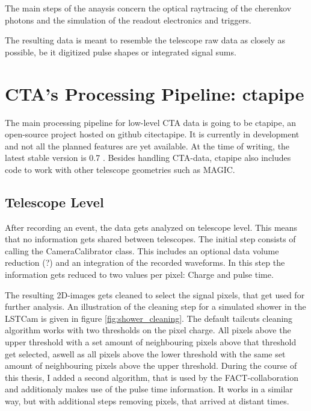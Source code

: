 The main steps of the anaysis concern the optical raytracing of the cherenkov photons
and the simulation of the readout electronics and triggers.

The resulting data is meant to resemble the telescope raw data as closely as possible,
be it digitized pulse shapes or integrated signal sums.

\section{CTA's Processing Pipeline: ctapipe}
The main processing pipeline for low-level  CTA data is going to be ctapipe,
an open-source project hosted on github cite{ctapipe}.
It is currently in development and not all the planned 
features are yet available.
At the time of writing, the latest stable version is 0.7
\cite{karl_kosack_2019_3372211}.
Besides handling CTA-data, ctapipe also includes code to work with
other telescope geometries such as MAGIC.

\subsection{Telescope Level}
After recording an event, the data gets analyzed on telescope level.
This means that no information gets shared between telescopes.
The initial step consists of calling the
CameraCalibrator class. This includes an optional
data volume reduction (?) and an integration of the recorded waveforms.
In this step the information gets reduced to two values per pixel:
Charge and pulse time.

The resulting 2D-images gets cleaned to select the signal pixels,
that get used for further analysis.
An illustration of the cleaning step 
for a simulated shower in the LSTCam is given in figure \ref{fig:shower_cleaning}.
The default tailcuts cleaning algorithm works with two thresholds on the 
pixel charge. All pixels above the upper threshold with a set amount of neighbouring 
pixels above that threshold get selected, aswell as 
all pixels above the lower threshold with the same set amount of neighbouring pixels
above the upper threshold.
During the course of this thesis, I added a second algorithm, that is used by the FACT-collaboration 
and additionaly makes use of the pulse time information.
It works in a similar way, but with additional steps removing pixels, that arrived
at distant times.


